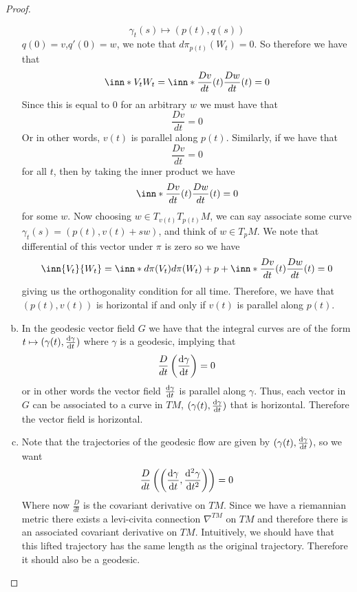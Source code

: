 \documentclass[a4paper]{article}
\begin{document}
\begin{proof}
\begin{enumerate}[a)]
        \[
          \gamma_t(s) \mapsto  (p(t), q(s))
        \]
        $q(0) = v$,$q'(0) = w$, we note that $d\pi_{p(t)}(W_t) = 0$. So therefore we have that
        \[
          \inn*{V_t}{W_t} = \inn*{\frac{Dv}{dt}(t)}{\frac{Dw}{dt}(t)} = 0
        \]
        Since this is equal to 0 for an arbitrary $w$ we must have that
        \[
          \frac{Dv}{dt} = 0
        \]
        Or in other words, $v(t)$ is parallel along $p(t)$. Similarly, if we have that 
        \[
          \frac{Dv}{dt} = 0
        \]
        for all $t$, then by taking the inner product we have
        \[
          \inn*{\frac{Dv}{dt}(t)}{\frac{Dw}{dt}(t)} = 0
        \]
        for some $w$. Now choosing $w \in T_{v(t)}T_{p(t)}M$, we can say associate some curve $\gamma_t(s) = (p(t),v(t) + sw)$, and think of $w \in T_pM$. We note that differential of this vector under $\pi$ is zero so we have
        \[
          \inn{V_t}{W_t} = \inn*{d\pi(V_t)}{d\pi(W_t)}+p + \inn*{\frac{Dv}{dt}(t)}{\frac{Dw}{dt}(t)} =0
        \]
        giving us the orthogonality condition for all time. Therefore, we have that $(p(t), v(t))$ is horizontal if and only if $v(t)$ is parallel along $p(t)$.
      \item In the geodesic vector field $G$ we have that the integral curves are of the form $t \mapsto (\gamma(t), \dv{\gamma}{t})$ where $\gamma$ is a geodesic, implying that 
        \[
          \frac{D}{dt} \left( \dv{\gamma}{t} \right) = 0
        \]
        or in other words the vector field $\dv{\gamma}{t}$ is parallel along $\gamma$. Thus, each vector in $G$ can be associated to a curve in $TM$, $(\gamma(t), \dv{\gamma}{t})$ that is horizontal. Therefore the vector field is horizontal.
      \item Note that the trajectories of the geodesic flow are given by $(\gamma(t), \dv{\gamma}{t})$, so we want 
        \[
          \frac{D}{dt} \left( \left( \dv{\gamma}{t}, \dv[2]{\gamma}{t} \right) \right) = 0
        \]
        Where now $\frac{D}{dt}$ is the covariant derivative on $TM$. Since we have a riemannian metric there exists a levi-civita connection $\nabla^{TM}$ on $TM$ and therefore there is an associated covariant derivative on $TM$. Intuitively, we should have that this lifted trajectory has the same length as the original trajectory. Therefore it should also be a geodesic.
    \end{enumerate}

  \end{proof}
\end{document}
